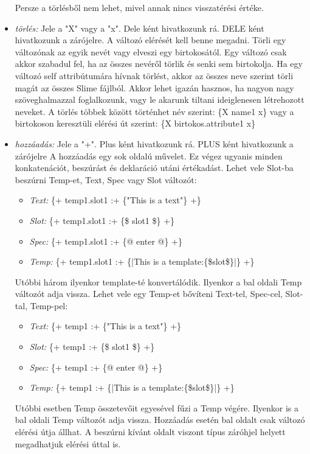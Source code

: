 \begin{itemize}
\begin{itemize}
\end{itemize}
Persze a törlésből nem lehet, mivel annak nincs visszatérési értéke.
\item \emph{törlés:} 
Jele a "X" vagy a "x".
Dele ként hivatkozunk rá.
DELE ként hivatkozunk a zárójelre.
A változó elérését kell benne megadni.
Törli egy változónak az egyik nevét vagy elveszi egy birtokosától.
Egy változó csak akkor szabadul fel, ha az összes nevéről törlik és senki sem birtokolja.
Ha egy változó self attribútumára hívnak törlést, akkor az összes neve szerint törli magát az összes Slime fájlból.
Akkor lehet igazán hasznos, ha nagyon nagy szöveghalmazzal foglalkozunk, vagy le akarunk tiltani ideiglenesen létrehozott neveket.
A törlés többek között történhet név szerint: \{X name1 x\} vagy a birtokoson keresztüli elérési út szerint: \{X birtokos.attribute1 x\} 
\item \emph{hozzáadás:}
Jele a "+".
Plus ként hivatkozunk rá.
PLUS ként hivatkozunk a zárójelre
A hozzáadás egy sok oldalú művelet. 
Ez végez ugyanis minden konkatenációt, beszúrást és deklaráció utáni értékadást.
Lehet vele Slot-ba beszúrni Temp-et, Text, Spec vagy Slot változót: 
\begin{itemize}
\item\emph{Text:} \{+ temp1.slot1 :+ \{"This is a text"\} +\}
\item\emph{Slot:} \{+ temp1.slot1 :+ \{\$ slot1 \$\} +\}
\item\emph{Spec:} \{+ temp1.slot1 :+ \{@ enter @\} +\}
\item\emph{Temp:} \{+ temp1.slot1 :+ \{|This is a template:\{\$slot\$\}|\} +\}
\end{itemize}
Utóbbi három ilyenkor template-té konvertálódik. 
Ilyenkor a bal oldali Temp változót adja vissza.
Lehet vele egy Temp-et bővíteni Text-tel, Spec-cel, Slot-tal, Temp-pel:
\begin{itemize}
\item\emph{Text:} \{+ temp1 :+ \{"This is a text"\} +\}
\item\emph{Slot:} \{+ temp1 :+ \{\$ slot1 \$\} +\}
\item\emph{Spec:} \{+ temp1 :+ \{@ enter @\} +\}
\item\emph{Temp:} \{+ temp1 :+ \{|This is a template:\{\$slot\$\}|\} +\}
\end{itemize} 
Utóbbi esetben Temp összetevőit egyesével fűzi a Temp végére.
Ilyenkor is a bal oldali Temp változót adja vissza.
Hozzáadás esetén bal oldalt csak változó elérési útja állhat.
A beszúrni kívánt oldalt viszont típus záróhjel helyett megadhatjuk elérési úttal is.

\end{itemize}
